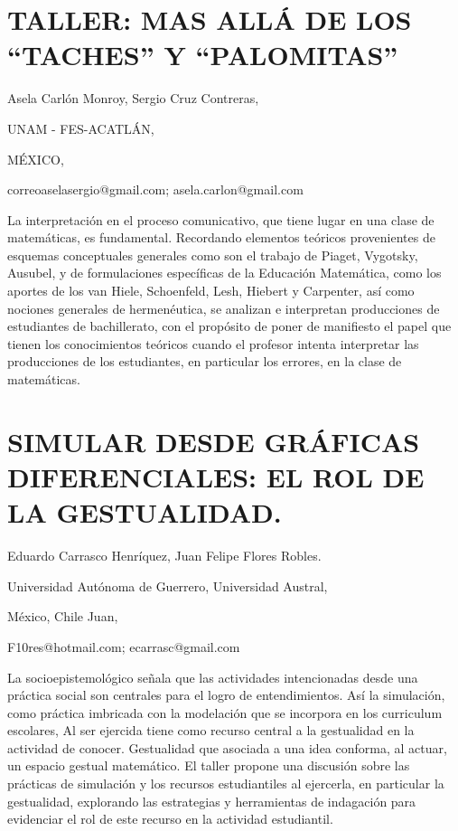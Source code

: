 \section{TALLER: MAS ALLÁ DE LOS “TACHES” Y “PALOMITAS”}

\begin{datos}

Asela Carlón Monroy, Sergio Cruz Contreras,

UNAM - FES-ACATLÁN, 

MÉXICO,

correoaselasergio@gmail.com; asela.carlon@gmail.com

\end{datos}

La interpretación en el proceso comunicativo, que tiene lugar en una
clase de matemáticas, es fundamental. Recordando elementos teóricos
provenientes de esquemas conceptuales generales como son el trabajo
de Piaget, Vygotsky, Ausubel, y de formulaciones específicas de la
Educación Matemática, como los aportes de los van Hiele, Schoenfeld,
Lesh, Hiebert y Carpenter, así como nociones generales de hermenéutica,
se analizan e interpretan producciones de estudiantes de bachillerato,
con el propósito de poner de manifiesto el papel que tienen los conocimientos
teóricos cuando el profesor intenta interpretar las producciones de
los estudiantes, en particular los errores, en la clase de matemáticas.


\section{SIMULAR DESDE GRÁFICAS DIFERENCIALES: EL ROL DE LA GESTUALIDAD.}

\begin{datos}

Eduardo Carrasco Henríquez, Juan Felipe Flores Robles.

Universidad Autónoma de Guerrero, Universidad Austral, 

México, Chile Juan,

F10res@hotmail.com; ecarrasc@gmail.com

\end{datos}

La socioepistemológico señala que las actividades intencionadas desde
una práctica social son centrales para el logro de entendimientos.
Así la simulación, como práctica imbricada con la modelación que se
incorpora en los curriculum escolares, Al ser ejercida tiene como
recurso central a la gestualidad en la actividad de conocer. Gestualidad
que asociada a una idea conforma, al actuar, un espacio gestual matemático.
El taller propone una discusión sobre las prácticas de simulación
y los recursos estudiantiles al ejercerla, en particular la gestualidad,
explorando las estrategias y herramientas de indagación para evidenciar
el rol de este recurso en la actividad estudiantil.


